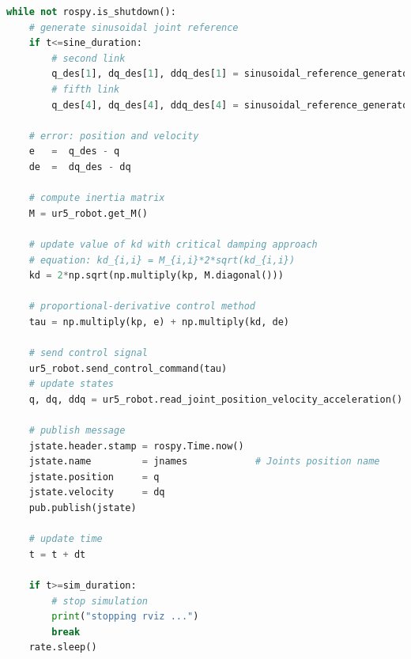 \begin{lstlisting}[language=Python,caption={Move the second and fifth joint of UR5 robot with the requirement motion of activity 1.5.2}, label={lst:joint_PD_control_critical_damping_sinusoidal}]
while not rospy.is_shutdown():
    # generate sinusoidal joint reference
    if t<=sine_duration:
        # second link
        q_des[1], dq_des[1], ddq_des[1] = sinusoidal_reference_generator(q0[1], dq0[1], ddq0[1], 0.2, 1, t)
        # fifth link
        q_des[4], dq_des[4], ddq_des[4] = sinusoidal_reference_generator(q0[4], dq0[4], ddq0[4], 0.4, 1.5, t) 

    # error: position and velocity
    e 	=  q_des - q
    de 	=  dq_des - dq    

    # compute inertia matrix
    M = ur5_robot.get_M()

    # update value of kd with critical damping approach
    # equation: kd_{i,i} = M_{i,i}*2*sqrt(kd_{i,i})
    kd = 2*np.sqrt(np.multiply(kp, M.diagonal()))

    # proportional-derivative control method
    tau = np.multiply(kp, e) + np.multiply(kd, de)
    
    # send control signal
    ur5_robot.send_control_command(tau)
    # update states
    q, dq, ddq = ur5_robot.read_joint_position_velocity_acceleration()

    # publish message
    jstate.header.stamp = rospy.Time.now()
    jstate.name 		= jnames			# Joints position name
    jstate.position 	= q
    jstate.velocity 	= dq
    pub.publish(jstate)

    # update time
    t = t + dt

    if t>=sim_duration:
        # stop simulation
        print("stopping rviz ...")
        break
    rate.sleep()
\end{lstlisting}


